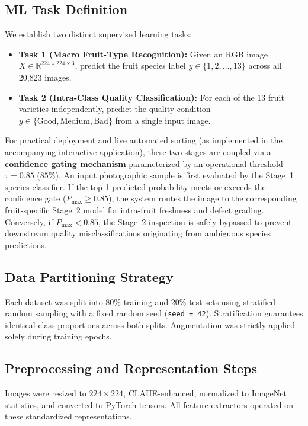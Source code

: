 \documentclass[11pt,a4paper]{article}
\begin{document}
\subsection{ML Task Definition}
We establish two distinct supervised learning tasks:
\begin{itemize}
    \item \textbf{Task 1 (Macro Fruit-Type Recognition):} Given an RGB image $X \in \mathbb{R}^{224 \times 224 \times 3}$, predict the fruit species label $y \in \{1, 2, \dots, 13\}$ across all 20,823 images.
    \item \textbf{Task 2 (Intra-Class Quality Classification):} For each of the 13 fruit varieties independently, predict the quality condition $y \in \{\text{Good}, \text{Medium}, \text{Bad}\}$ from a single input image.
\end{itemize}
For practical deployment and live automated sorting (as implemented in the accompanying interactive application), these two stages are coupled via a \textbf{confidence gating mechanism} parameterized by an operational threshold $\tau = 0.85$ ($85\%$). An input photographic sample is first evaluated by the Stage~1 species classifier. If the top-1 predicted probability meets or exceeds the confidence gate ($P_{\max} \ge 0.85$), the system routes the image to the corresponding fruit-specific Stage~2 model for intra-fruit freshness and defect grading. Conversely, if $P_{\max} < 0.85$, the Stage~2 inspection is safely bypassed to prevent downstream quality misclassifications originating from ambiguous species predictions.

\subsection{Data Partitioning Strategy}
Each dataset was split into 80\% training and 20\% test sets using stratified random sampling with a fixed random seed (\texttt{seed = 42}). Stratification guarantees identical class proportions across both splits. Augmentation was strictly applied solely during training epochs.

\subsection{Preprocessing and Representation Steps}
Images were resized to $224 \times 224$, CLAHE-enhanced, normalized to ImageNet statistics, and converted to PyTorch tensors. All feature extractors operated on these standardized representations.
\end{document}
